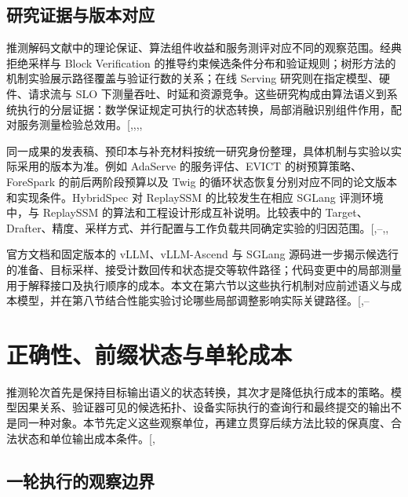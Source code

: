 \documentclass[
  a4paper,
  UTF8,
  fontset=none,
  zihao=5]{ctexart}
\begin{document}
\subsection{研究证据与版本对应}\label{source-versions}

推测解码文献中的理论保证、算法组件收益和服务测评对应不同的观察范围。经典拒绝采样与
Block Verification
的推导约束候选条件分布和验证规则；树形方法的机制实验展示路径覆盖与验证行数的关系；在线
Serving 研究则在指定模型、硬件、请求流与 SLO
下测量吞吐、时延和资源竞争。这些研究构成由算法语义到系统执行的分层证据：数学保证规定可执行的状态转换，局部消融识别组件作用，配对服务测量检验总效用。{[},,,,\citeproc{ref-blockverification}{23}{]}

同一成果的发表稿、预印本与补充材料按统一研究身份整理，具体机制与实验以实际采用的版本为准。例如
AdaServe 的服务评估、EVICT 的树预算策略、ForeSpark 的前后两阶段预算以及
Twig 的循环状态恢复分别对应不同的论文版本和实现条件。HybridSpec 对
ReplaySSM 的比较发生在相应 SGLang 评测环境中，与 ReplaySSM
的算法和工程设计形成互补说明。比较表中的
Target、Drafter、精度、采样方式、并行配置与工作负载共同确定实验的归因范围。{[},--,,\citeproc{ref-evict}{25}{]}

官方文档和固定版本的 vLLM、vLLM-Ascend 与 SGLang
源码进一步揭示候选行的准备、目标采样、接受计数回传和状态提交等软件路径；代码变更中的局部测量用于解释接口及执行顺序的成本。本文在第六节以这些执行机制对应前述语义与成本模型，并在第八节结合性能实验讨论哪些局部调整影响实际关键路径。{[},--\citeproc{ref-pr-d2h}{31}{]}

\section{正确性、前缀状态与单轮成本}\label{framework}

推测轮次首先是保持目标输出语义的状态转换，其次才是降低执行成本的策略。模型因果关系、验证器可见的候选拓扑、设备实际执行的查询行和最终提交的输出不是同一种对象。本节先定义这些观察单位，再建立贯穿后续方法比较的保真度、合法状态和单位输出成本条件。{[},\citeproc{ref-specinfer}{8}{]}

\subsection{一轮执行的观察边界}\label{round}
\end{document}
